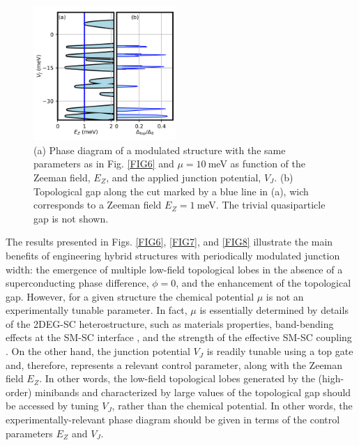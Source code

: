 \documentclass[twocolumn,aps,prb,nofootinbib]{revtex4-2}
\begin{document}
\begin{figure}[t]
\begin{center}
\includegraphics[width=0.48\textwidth]{Fig18_2.png}
\end{center}
\vspace{-3mm}
\caption{(a) Phase diagram of a modulated structure with the same parameters as in Fig. \ref{FIG6} and $\mu = 10~$meV as function of the Zeeman field, $E_Z$, and the applied junction potential, $V_J$. (b) Topological gap along the cut marked by a blue line in (a), wich corresponds to a Zeeman field $E_Z=1~$meV. The trivial quasiparticle gap is not shown.}
\label{FIG18}
\vspace{-3mm}
\end{figure}

The results presented in Figs. \ref{FIG6}, \ref{FIG7}, and \ref{FIG8} illustrate the main benefits of engineering hybrid structures with periodically modulated junction width: the emergence of multiple low-field topological lobes in the absence of a superconducting phase difference,  $\phi = 0$, and the  enhancement of the topological gap. 
However, for a given structure the chemical potential $\mu$ is not an experimentally  tunable parameter. In fact, $\mu$ is essentially determined by details of the 2DEG-SC heterostructure, such as materials properties, band-bending effects at the SM-SC interface \cite{Woods2018,Winkler2019}, and the strength of the effective SM-SC coupling \cite{Stanescu2017a,Reeg2018a}. On the other hand, the junction potential $V_J$ is readily tunable using a top gate and, therefore, represents a relevant control parameter, along with the Zeeman field $E_Z$. In other words, the low-field topological lobes generated by the (high-order) minibands and characterized by large values of the topological gap should be accessed by tuning $V_J$, rather than the chemical potential. In other words, the experimentally-relevant phase diagram should be given in terms of the control parameters $E_Z$ and $V_J$. 
\end{document}
